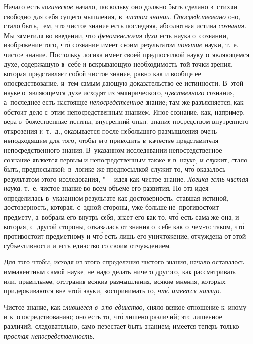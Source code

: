 Начало есть {\em логическое} начало, поскольку оно должно быть сделано в~стихии
свободно для себя сущего мышления, в~{\em чистом знании}. {\em Опосредствовано}
оно, стало быть, тем, что чистое знание есть последняя, абсолютная истина {\em
сознания}. Мы заметили во введении, что {\em феноменология духа} есть наука
о~сознании, изображение того, чт\'{о} сознание имеет своим результатом
{\em понятие} науки, т.~е. чистое знание. Постольку логика имеет своей
предпосылкой науку о~являющемся духе, содержащую в~себе и вскрывающую
необходимость той точки зрения, которая представляет собой чистое знание, равно
как и вообще ее опосредствование, и~тем самым дающую доказательство ее
истинности. В~этой науке о~являющемся духе исходят из эмпирического,
{\em чувственного} сознания, а~последнее есть настоящее {\em непосредственное}
знание; там же разъясняется, как обстоит дело с~этим непосредственным знанием.
Иное сознание, как, например, вера в~божественные истины, внутренний опыт,
знание посредством внутреннего откровения и~т.~д., оказывается после небольшого
размышления очень неподходящим для того, чтобы его приводить в~качестве
представителя непосредственного знания. В~указанном исследовании
непосредственное сознание является первым и непосредственным также и в~науке, и
служит, стало быть, предпосылкой; в~логике же предпосылкой служит то, чт\'{о}
оказалось результатом этого исследования, "--- идея как чистое знание.
{\em Логика есть чистая наука,} т.~е. чистое знание во всем объеме его
развития. Но эта идея определилась в~указанном результате как достоверность,
ставшая истиной, достоверность, которая, с~одной стороны, уже больше
не~противостоит предмету, а~вобрала его внутрь себя, знает его как то, чт\'{о}
есть сама же она, и которая, с~другой стороны, отказалась от знания о~себе как
о~чем-то таком, чт\'{о} противостоит предметному и чт\'{о} есть лишь его
уничтожение, отчуждена от этой субъективности и есть единство
со своим отчуждением.

Для того чтобы, исходя из этого определения чистого знания, начало оставалось
имманентным самой науке, не надо делать ничего другого, как рассматривать или,
правильнее, отстранив всякие размышления, всякие мнения, которых придерживаются
вне этой науки, воспринимать то, {\em чт\'{о} имеется налицо}.

Чистое знание, как {\em слившееся в~это единство,} сняло всякое отношение
к~иному и к~опосредствованию; оно есть то, чт\'{о} лишено различий; это
лишенное различий, следовательно, само перестает быть знанием; имеется теперь
только {\em простая непосредственность}.

